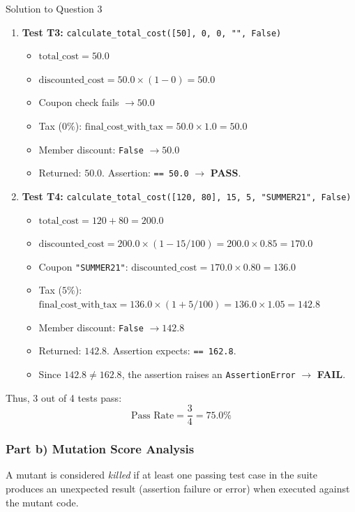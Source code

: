 \documentclass[11pt,a4paper]{article}
\begin{document}
\begin{solutionbox}{Solution to Question 3}
\begin{enumerate}[label=\textbf{\arabic*.}]
    \item \textbf{Test T3:} \texttt{calculate\_total\_cost([50], 0, 0, "", False)}
    \begin{itemize}
        \item $\text{total\_cost} = 50.0$
        \item $\text{discounted\_cost} = 50.0 \times (1 - 0) = 50.0$
        \item Coupon check fails $\rightarrow 50.0$
        \item Tax ($0\%$): $\text{final\_cost\_with\_tax} = 50.0 \times 1.0 = 50.0$
        \item Member discount: \texttt{False} $\rightarrow 50.0$
        \item Returned: $50.0$. Assertion: \texttt{== 50.0} $\rightarrow$ \textbf{PASS}.
    \end{itemize}

    \item \textbf{Test T4:} \texttt{calculate\_total\_cost([120, 80], 15, 5, "SUMMER21", False)}
    \begin{itemize}
        \item $\text{total\_cost} = 120 + 80 = 200.0$
        \item $\text{discounted\_cost} = 200.0 \times (1 - 15 / 100) = 200.0 \times 0.85 = 170.0$
        \item Coupon \texttt{"SUMMER21"}: $\text{discounted\_cost} = 170.0 \times 0.80 = 136.0$
        \item Tax ($5\%$): $\text{final\_cost\_with\_tax} = 136.0 \times (1 + 5 / 100) = 136.0 \times 1.05 = 142.8$
        \item Member discount: \texttt{False} $\rightarrow 142.8$
        \item Returned: $\mathbf{142.8}$. Assertion expects: \texttt{== 162.8}.
        \item Since $142.8 \neq 162.8$, the assertion raises an \texttt{AssertionError} $\rightarrow$ \textbf{FAIL}.
    \end{itemize}
\end{enumerate}
Thus, 3 out of 4 tests pass:
\[
\text{Pass Rate} = \frac{3}{4} = 75.0\%
\]

\subsubsection*{Part b) Mutation Score Analysis}
A mutant is considered \textit{killed} if at least one passing test case in the suite produces an unexpected result (assertion failure or error) when executed against the mutant code.


\end{solutionbox}
\end{document}
